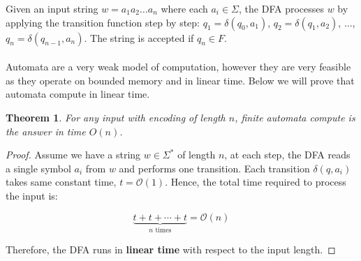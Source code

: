 \documentclass{pracalicmgr2025}
\theoremstyle{plain}            %
\newtheorem{theorem}{Theorem}[chapter]
\theoremstyle{remark}           %
\theoremstyle{definition}       %
\begin{document}
Given an input string $w = a_1 a_2 \ldots a_n$ where each $a_i \in \Sigma$, the DFA processes $w$ by applying the transition function step by step:
$q_1 = \delta(q_0, a_1)$, $q_2 = \delta(q_1, a_2)$, $\ldots$, $q_n = \delta(q_{n-1}, a_n)$.  
The string is accepted if $q_n \in F$.
\\
\\
Automata are a very weak model of computation, however they are very feasible as they operate on bounded memory and in linear time. Below we will prove that automata compute in linear time.
\begin{theorem}
    For any input with encoding of length $n$, finite automata compute is the answer in time $O(n)$.
\end{theorem}
\begin{proof}
    
Assume we have a string $w \in \Sigma^*$ of length $n$, at each step, the DFA reads a single symbol $a_i$ from $w$ and performs one transition. Each transition $\delta(q, a_i)$ takes same constant time, $t = \mathcal{O}(1)$. Hence, the total time required to process the input is:

$$
\underbrace{t +t + \cdots + t}_{n\text{ times}} = \mathcal{O}(n)
$$

Therefore, the DFA runs in \textbf{linear time} with respect to the input length.
\end{proof}

\end{document}
